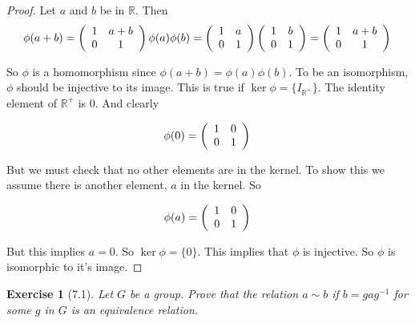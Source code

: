 \documentclass[12pt,leqno]{article}
\numberwithin{equation}{section}
\newtheorem*{exer}{Exercise}
\theoremstyle{definition}
\begin{document}
\begin{proof}[Proof]
    Let $a$ and $b$ be in $\mathbb R$. Then
    $$
    \phi(a + b) = 
    \left (  \begin{array}{cc}
        1 & a + b \\
        0 & 1 
    \end{array} \right )\\
    \phi(a) \phi(b)
    =
    \left (  \begin{array}{cc}
        1 & a \\
        0 & 1 
    \end{array} \right )
    \left (  \begin{array}{cc}
        1 & b \\
        0 & 1 
    \end{array} \right )
    =
    \left (  \begin{array}{cc}
        1 & a + b \\
        0 & 1 
    \end{array} \right ) \\
    $$

    So $\phi$ is a homomorphism since $\phi(a + b) = \phi(a) \phi(b)$.  To be
    an isomorphism, $\phi$ should be injective to its image.  This is true if
    $\ker \phi  = \{ I_{\mathbb R^+} \}$. The identity element of $\mathbb R^+$
    is $0$. And clearly

    $$
    \phi(0) = 
    \left (  \begin{array}{cc}
        1 & 0 \\
        0 & 1 
    \end{array} \right ) \\
    $$

    But we must check that no other elements are in the kernel. To show this we
    assume there is another element, $a$ in the kernel. So 
     
    $$
    \phi(a) = 
    \left (  \begin{array}{cc}
        1 & 0 \\
        0 & 1 
    \end{array} \right ) \\
    $$

    But this implies $a = 0$. So $\ker \phi = \{0\}$. This implies 
    that $\phi$ is injective. So $\phi$ is isomorphic to it's image.

\end{proof}


\begin{exer}[7.1]
Let $G$ be a group. Prove that the relation $a \sim b$ if $b=gag^{-1}$ for some $g$ in $G$ is an equivalence relation.
\end{exer}
\end{document}
